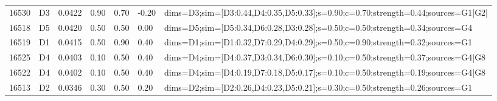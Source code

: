 \begin{table}[htbp]
\begin{tabular}{@{}lllllll@{}}
16530 & D3 & 0.0422 & 0.90 & 0.70 & -0.20 & dims=D3;sim=[D3:0.44,D4:0.35,D5:0.33];s=0.90;c=0.70;strength=0.44;sources=G1|G2| \\
16518 & D5 & 0.0420 & 0.50 & 0.50 & 0.00 & dims=D5;sim=[D5:0.34,D6:0.28,D3:0.28];s=0.50;c=0.50;strength=0.34;sources=G4 \\
16519 & D1 & 0.0415 & 0.50 & 0.90 & 0.40 & dims=D1;sim=[D1:0.32,D7:0.29,D4:0.29];s=0.50;c=0.90;strength=0.32;sources=G1 \\
16525 & D4 & 0.0403 & 0.10 & 0.50 & 0.40 & dims=D4;sim=[D4:0.37,D3:0.34,D6:0.30];s=0.10;c=0.50;strength=0.37;sources=G4|G8 \\
16522 & D4 & 0.0402 & 0.10 & 0.50 & 0.40 & dims=D4;sim=[D4:0.19,D7:0.18,D5:0.17];s=0.10;c=0.50;strength=0.19;sources=G4|G8 \\
16513 & D2 & 0.0346 & 0.30 & 0.50 & 0.20 & dims=D2;sim=[D2:0.26,D4:0.23,D5:0.21];s=0.30;c=0.50;strength=0.26;sources=G1 \\
\bottomrule
\end{tabular}
\end{table}
